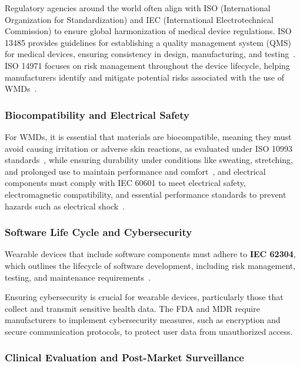 \documentclass[journal]{IEEEtran}
\begin{document}
    Regulatory agencies around the world often align with ISO (International Organization for Standardization) and IEC (International Electrotechnical Commission) to ensure global harmonization of medical device regulations. ISO 13485 provides guidelines for establishing a quality management system (QMS) for medical devices, ensuring consistency in design, manufacturing, and testing~\cite{ISO2016}. ISO 14971 focuses on risk management throughout the device lifecycle, helping manufacturers identify and mitigate potential risks associated with the use of WMDs~\cite{ISO2019}.

        \subsubsection{Biocompatibility and Electrical Safety}

        For WMDs, it is essential that materials are biocompatible, meaning they must avoid causing irritation or adverse skin reactions, as evaluated under ISO 10993 standards~\cite{ISO2018}, while ensuring durability under conditions like sweating, stretching, and prolonged use to maintain performance and comfort~\cite{Chen2020}, and electrical components must comply with IEC 60601 to meet electrical safety, electromagnetic compatibility, and essential performance standards to prevent hazards such as electrical shock~\cite{IEC2012}.
        
        \subsubsection{Software Life Cycle and Cybersecurity}

        Wearable devices that include software components must adhere to \textbf{IEC 62304}, which outlines the lifecycle of software development, including risk management, testing, and maintenance requirements~\cite{IEC2006}.

        Ensuring cybersecurity is crucial for wearable devices, particularly those that collect and transmit sensitive health data. The FDA and MDR require manufacturers to implement cybersecurity measures, such as encryption and secure communication protocols, to protect user data from unauthorized access.

        \subsubsection{Clinical Evaluation and Post-Market Surveillance}
\end{document}
